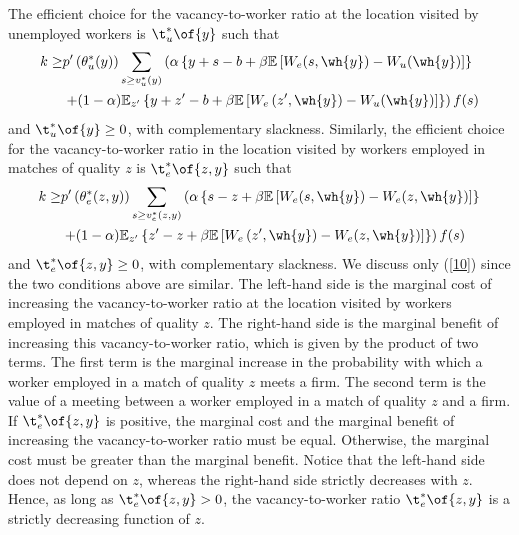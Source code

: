 \documentclass[12pt]{article}
\theoremstyle{definition}
\begin{document}
The efficient choice for the vacancy-to-worker ratio at the location visited by unemployed workers is $\t_u^*\of{y}$ such that 
\begin{equation}
    \label{9}
    \begin{aligned}
        k \geq & p^{\prime}\left(\theta_u^*(y)\right) \sum_{s \geq v_u^*(y)}\left(\alpha\left\{y+s-b+\beta \mathbb{E}\left[W_e(s, \wh{y})-W_u(\wh{y})\right]\right\}\right. \\
        & \left.+(1-\alpha) \mathbb{E}_{z^{\prime}}\left\{y+z^{\prime}-b+\beta \mathbb{E}\left[W_e\left(z^{\prime}, \wh{y}\right)-W_u(\wh{y})\right]\right\}\right) f(s)
    \end{aligned}
\end{equation}
and $\t_u^*\of{y} \geq 0$, with complementary slackness. Similarly, the efficient choice for the vacancy-to-worker ratio in the location visited by workers employed in matches of quality $z$ is $\t_e^*\of{z, y}$ such that 
\begin{equation}
    \label{10}
    \begin{aligned}
        k \geq & p^{\prime}\left(\theta_e^*(z, y)\right) \sum_{s \geq v_e^*(z, y)}\left(\alpha\left\{s-z+\beta \mathbb{E}\left[W_e(s, \wh{y})-W_e(z, \wh{y})\right]\right\}\right. \\
        & \left.+(1-\alpha) \mathbb{E}_{z^{\prime}}\left\{z^{\prime}-z+\beta \mathbb{E}\left[W_e\left(z^{\prime}, \wh{y}\right)-W_e(z, \wh{y})\right]\right\}\right) f(s)
    \end{aligned}
\end{equation}
and $\t_e^*\of{z, y} \geq 0$, with complementary slackness. We discuss only (\ref{10}) since the two conditions above are similar. The left-hand side is the marginal cost of increasing the vacancy-to-worker ratio at the location visited by workers employed in matches of quality $z$. The right-hand side is the marginal benefit of increasing this vacancy-to-worker ratio, which is given by the product of two terms. The first term is the marginal increase in the probability with which a worker employed in a match of quality $z$ meets a firm. The second term is the value of a meeting between a worker employed in a match of quality $z$ and a firm. If $\t_e^*\of{z,y}$ is positive, the marginal cost and the marginal benefit of increasing the vacancy-to-worker ratio must be equal. Otherwise, the marginal cost must be greater than the marginal benefit. Notice that the left-hand side does not depend on $z$, whereas the right-hand side strictly decreases with $z$. Hence, as long as $\t_e^*\of{z, y} > 0$, the vacancy-to-worker ratio $\t_e^*\of{z,y}$ is a strictly decreasing function of $z$.
\end{document}
